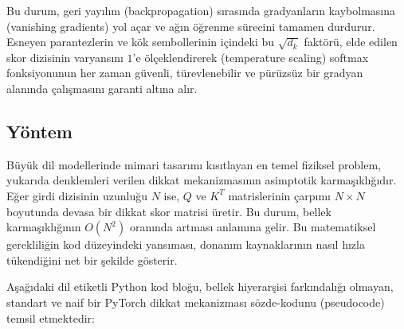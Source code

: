 \documentclass[11pt,a4paper]{article}
\begin{document}
Bu durum, geri yayılım (backpropagation) sırasında gradyanların kaybolmasına (vanishing gradients) yol açar ve ağın öğrenme sürecini tamamen durdurur. Esneyen parantezlerin ve kök sembollerinin içindeki bu \(\sqrt{d_k}\) faktörü, elde edilen skor dizisinin varyansını \(1\)'e ölçeklendirerek (temperature scaling) softmax fonksiyonunun her zaman güvenli, türevlenebilir ve pürüzsüz bir gradyan alanında çalışmasını garanti altına alır.

\subsection{Yöntem}
Büyük dil modellerinde mimari tasarımı kısıtlayan en temel fiziksel problem, yukarıda denklemleri verilen dikkat mekanizmasının asimptotik karmaşıklığıdır. Eğer girdi dizisinin uzunluğu \(N\) ise, \(Q\) ve \(K^T\) matrislerinin çarpımı \(N \times N\) boyutunda devasa bir dikkat skor matrisi üretir. Bu durum, bellek karmaşıklığının \(O(N^2)\) oranında artması anlamına gelir. Bu matematiksel gerekliliğin kod düzeyindeki yansıması, donanım kaynaklarının nasıl hızla tükendiğini net bir şekilde gösterir.

Aşağıdaki dil etiketli Python kod bloğu, bellek hiyerarşisi farkındalığı olmayan, standart ve naif bir PyTorch dikkat mekanizması sözde-kodunu (pseudocode) temsil etmektedir:
\end{document}
